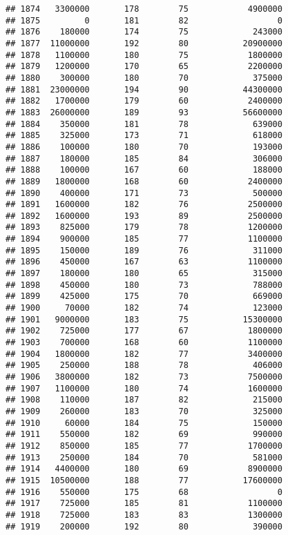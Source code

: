 \documentclass[
]{article}
\begin{document}
\begin{verbatim}
## 1874   3300000       178        75            4900000
## 1875         0       181        82                  0
## 1876    180000       174        75             243000
## 1877  11000000       192        80           20900000
## 1878   1100000       180        75            1800000
## 1879   1200000       170        65            2200000
## 1880    300000       180        70             375000
## 1881  23000000       194        90           44300000
## 1882   1700000       179        60            2400000
## 1883  26000000       189        93           56600000
## 1884    350000       181        78             639000
## 1885    325000       173        71             618000
## 1886    100000       180        70             193000
## 1887    180000       185        84             306000
## 1888    100000       167        60             188000
## 1889   1800000       168        60            2400000
## 1890    400000       171        73             500000
## 1891   1600000       182        76            2500000
## 1892   1600000       193        89            2500000
## 1893    825000       179        78            1200000
## 1894    900000       185        77            1100000
## 1895    150000       189        76             311000
## 1896    450000       167        63            1100000
## 1897    180000       180        65             315000
## 1898    450000       180        73             788000
## 1899    425000       175        70             669000
## 1900     70000       182        74             123000
## 1901   9000000       183        75           15300000
## 1902    725000       177        67            1800000
## 1903    700000       168        60            1100000
## 1904   1800000       182        77            3400000
## 1905    250000       188        78             406000
## 1906   3800000       182        73            7500000
## 1907   1100000       180        74            1600000
## 1908    110000       187        82             215000
## 1909    260000       183        70             325000
## 1910     60000       184        75             150000
## 1911    550000       182        69             990000
## 1912    850000       185        77            1700000
## 1913    250000       184        70             581000
## 1914   4400000       180        69            8900000
## 1915  10500000       188        77           17600000
## 1916    550000       175        68                  0
## 1917    725000       185        81            1100000
## 1918    725000       183        83            1300000
## 1919    200000       192        80             390000

\end{verbatim}
\end{document}
